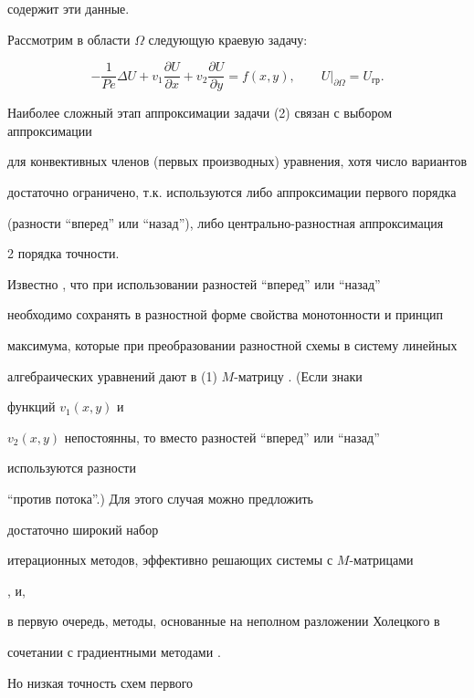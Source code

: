 содержит эти данные. 


 


Рассмотрим в области $\Omega$ следующую краевую задачу: 


\begin{equation} 


-\frac{1}{Pe}\Delta U+v_1\frac{\partial U}{\partial x}+ 


v_2\frac{\partial U}{\partial y}=f(x,y),\qquad 


\left. U\right|_{\partial \Omega}=U_{\text{гр}}. 


\end{equation} 


Наиболее сложный этап аппроксимации задачи (2) связан с выбором аппроксимации 


для конвективных членов (первых производных) уравнения, хотя число вариантов 


достаточно ограничено, т.к. используются либо аппроксимации первого порядка 


(разности ``вперед'' или ``назад''), либо центрально-разностная аппроксимация 


2 порядка точности. 


 


Известно \cite{Ro}, что при использовании разностей ``вперед'' или ``назад'' 


необходимо сохранять в разностной форме свойства монотонности и принцип 


максимума, которые при преобразовании разностной схемы в систему линейных 


алгебраических уравнений дают в (1) $M$-матрицу \cite{Neu}. (Если знаки 


функций $v_1(x,y)$ и 


$v_2(x,y)$ непостоянны, то вместо разностей ``вперед'' или ``назад'' 


используются разности 


``против потока''.) Для этого случая можно предложить 


достаточно широкий набор 


итерационных методов, эффективно решающих системы с $M$-матрицами 


\cite{Y}, и, 


в первую очередь, методы, основанные на неполном разложении Холецкого в 


сочетании с градиентными методами \cite{Mei}. 


Но низкая точность схем первого 



